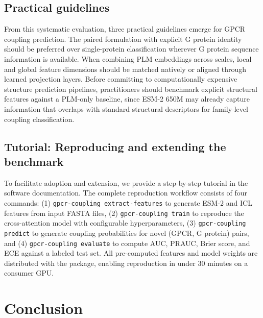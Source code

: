 \documentclass[11pt,a4paper]{article}
\begin{document}
\subsection{Practical guidelines}

From this systematic evaluation, three practical guidelines emerge for GPCR coupling prediction. The paired formulation with explicit G protein identity should be preferred over single-protein classification wherever G protein sequence information is available. When combining PLM embeddings across scales, local and global feature dimensions should be matched natively or aligned through learned projection layers. Before committing to computationally expensive structure prediction pipelines, practitioners should benchmark explicit structural features against a PLM-only baseline, since ESM-2 650M may already capture information that overlaps with standard structural descriptors for family-level coupling classification.

\subsection{Tutorial: Reproducing and extending the benchmark}

To facilitate adoption and extension, we provide a step-by-step tutorial in the software documentation. The complete reproduction workflow consists of four commands: (1) \texttt{gpcr-coupling extract-features} to generate ESM-2 and ICL features from input FASTA files, (2) \texttt{gpcr-coupling train} to reproduce the cross-attention model with configurable hyperparameters, (3) \texttt{gpcr-coupling predict} to generate coupling probabilities for novel (GPCR, G protein) pairs, and (4) \texttt{gpcr-coupling evaluate} to compute AUC, PRAUC, Brier score, and ECE against a labeled test set. All pre-computed features and model weights are distributed with the package, enabling reproduction in under 30 minutes on a consumer GPU.

\section{Conclusion}
\end{document}
